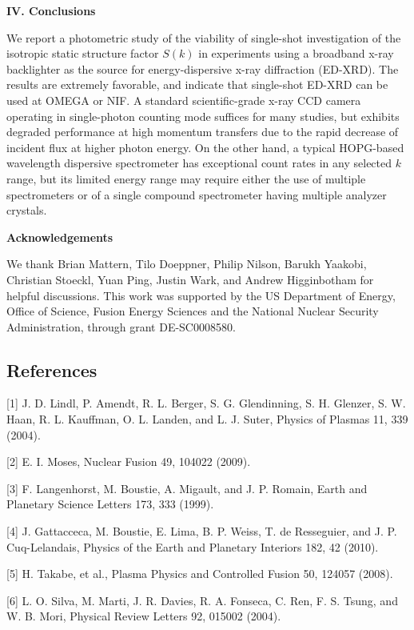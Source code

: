 \textbf{IV. Conclusions}

We report a photometric study of the viability of single-shot
investigation of the isotropic static structure factor \(S(k)\) in
experiments using a broadband x-ray backlighter as the source for
energy-dispersive x-ray diffraction (ED-XRD). The results are extremely
favorable, and indicate that single-shot ED-XRD can be used at OMEGA or
NIF. A standard scientific-grade x-ray CCD camera operating in
single-photon counting mode suffices for many studies, but exhibits
degraded performance at high momentum transfers due to the rapid
decrease of incident flux at higher photon energy. On the other hand, a
typical HOPG-based wavelength dispersive spectrometer has exceptional
count rates in any selected \(k\) range, but its limited energy range
may require either the use of multiple spectrometers or of a single
compound spectrometer having multiple analyzer crystals.

\textbf{Acknowledgements}

We thank Brian Mattern, Tilo Doeppner, Philip Nilson, Barukh Yaakobi,
Christian Stoeckl, Yuan Ping, Justin Wark, and Andrew Higginbotham for
helpful discussions. This work was supported by the US Department of
Energy, Office of Science, Fusion Energy Sciences and the National
Nuclear Security Administration, through grant DE-SC0008580.\textbf{\\}

\subsection{References}\label{references}

{[}1{]} J. D. Lindl, P. Amendt, R. L. Berger, S. G. Glendinning, S. H. Glenzer, S. W. Haan, R. L. Kauffman, O. L. Landen, and L. J. Suter, Physics of Plasmas 11, 339 (2004).

{[}2{]} E. I. Moses, Nuclear Fusion 49, 104022 (2009).

{[}3{]} F. Langenhorst, M. Boustie, A. Migault, and J. P. Romain, Earth and Planetary Science Letters 173, 333 (1999).

{[}4{]} J. Gattacceca, M. Boustie, E. Lima, B. P. Weiss, T. de Resseguier, and J. P. Cuq-Lelandais, Physics of the Earth and Planetary Interiors 182, 42 (2010).

{[}5{]} H. Takabe, et al., Plasma Physics and Controlled Fusion 50, 124057 (2008).

{[}6{]} L. O. Silva, M. Marti, J. R. Davies, R. A. Fonseca, C. Ren, F. S. Tsung, and W. B. Mori, Physical Review Letters 92, 015002 (2004).

